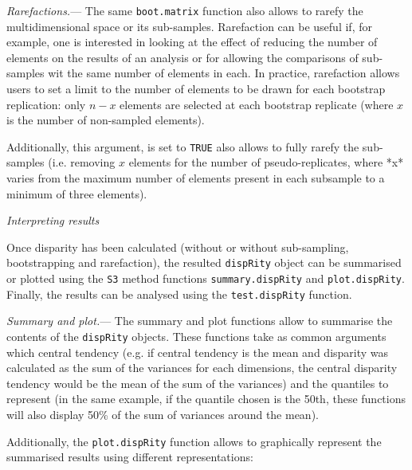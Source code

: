 \documentclass[12pt,letterpaper]{article}
\renewcommand{\subsection}[1]{%
\bigskip
\begin{center}
\begin{large}
\normalfont\itshape #1
\end{large}
\end{center}}
\renewcommand{\subsubsection}[1]{%
\vspace{2ex}
\noindent
\textit{#1.}---}
\newcommand{\disp}{\texttt{dispRity} }
\begin{document}
\subsubsection{Rarefactions}
The same \texttt{boot.matrix} function also allows to rarefy the multidimensional space or its sub-samples.
Rarefaction can be useful if, for example, one is interested in looking at the effect of reducing the number of elements on the results of an analysis or for allowing the comparisons of sub-samples wit the same number of elements in each.
In practice, rarefaction allows users to set a limit to the number of elements to be drawn for each bootstrap replication: only $n-x$ elements are selected at each bootstrap replicate (where $x$ is the number of non-sampled elements).

Additionally, this argument, is set to \texttt{TRUE} also allows to fully rarefy the sub-samples (i.e. removing $x$ elements for the number of pseudo-replicates, where *x* varies from the maximum number of elements present in each subsample to a minimum of three elements).

\subsection{Interpreting results}
Once disparity has been calculated (without or without sub-sampling, bootstrapping and rarefaction), the resulted \disp object can be summarised or plotted using the \texttt{S3} method functions \texttt{summary.dispRity} and \texttt{plot.dispRity}.
Finally, the results can be analysed using the \texttt{test.dispRity} function.

\subsubsection{Summary and plot}
The summary and plot functions allow to summarise the contents of the \disp objects.
These functions take as common arguments which central tendency (e.g. if central tendency is the mean and disparity was calculated as the sum of the variances for each dimensions, the central disparity tendency would be the mean of the sum of the variances) and the quantiles to represent (in the same example, if the quantile chosen is the 50th, these functions will also display 50\% of the sum of variances around the mean).

Additionally, the \texttt{plot.dispRity} function allows to graphically represent the summarised results using different representations:
\end{document}
